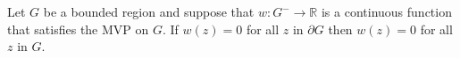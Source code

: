 Let $G$ be a bounded region and suppose that $w: G^- \to \mathbb{R}$ is a continuous function that satisfies the MVP on $G$. If $w(z) = 0$ for all $z$ in $\partial G$ then $w(z) = 0$ for all $z$ in $G$.
